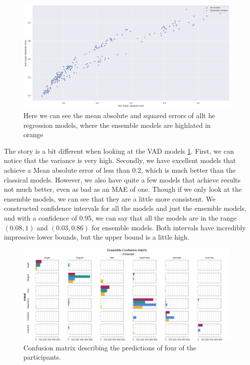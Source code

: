     \begin{figure}[!htp]
        \centering
        \includegraphics[width=14cm]{figures/results/nn_err}   
        \caption{Here we can see the mean absolute and squared errors of allt he regression models, where the ensemble models are highlated in orange}
        \label{fig:nn_err} 
    \end{figure}


    The story is a bit different when looking at the VAD models \ref{fig:nn_err}. First, we can notice that the variance is very high. 
    Secondly, we have excellent models that achieve a Mean absolute error of less than 0.2, which is much better than the classical models. However, 
    we also have quite a few models that achieve results not much better, even as bad as an MAE of one. Though if we only look at the ensemble models, 
    we can see that they are a little more consistent. We constructed confidence intervals for all the models and just the ensemble models, 
    and with a confidence of 0.95, we can say that all the models are in the range $(0.08, 1)$ and $(0.03, 0.86)$ for ensemble models. Both intervals 
    have incredibly impressive lower bounds, but the upper bound is a little high. 

    \begin{figure}[!htp]
        \centering
        \includegraphics[width=14cm]{figures/results/nn_ensemble_cm}   
        \caption{Confusion matrix describing the predictions of four of the participants.}
        \label{fig:nn_ensemble_cm} 
    \end{figure}

